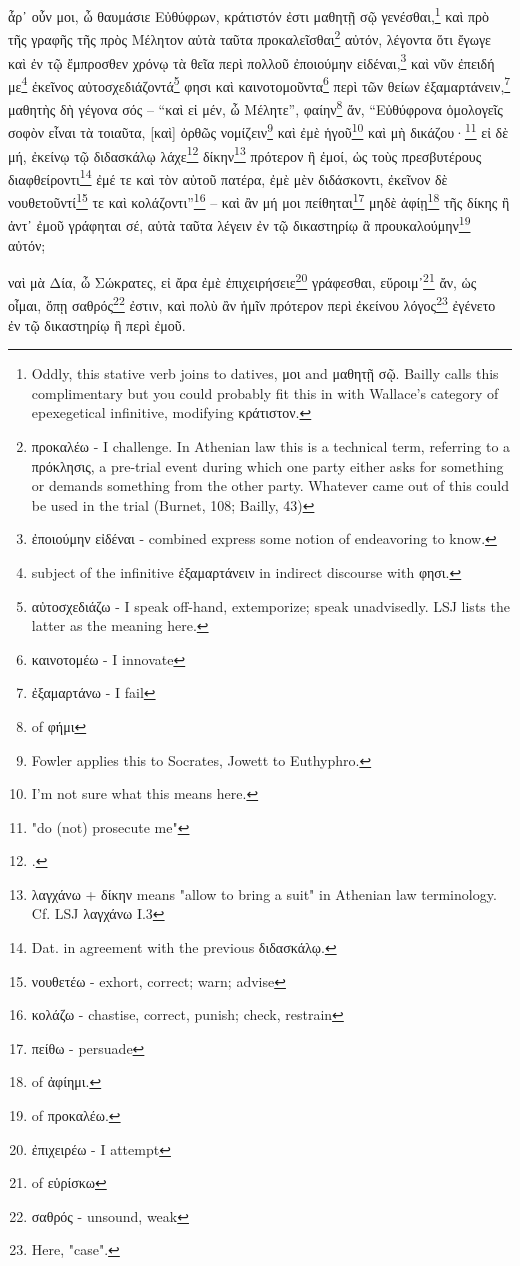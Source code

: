 ἆρ᾽
οὖν
μοι,
ὦ
θαυμάσιε
Εὐθύφρων,
κράτιστόν
ἐστι
μαθητῇ
σῷ
γενέσθαι,\footnote{Oddly, this stative verb joins to datives, μοι and μαθητῇ σῷ. Bailly calls this complimentary but you could probably fit this in with Wallace's category of epexegetical infinitive, modifying κράτιστον.}
καὶ
πρὸ
τῆς
γραφῆς
τῆς
πρὸς
Μέλητον
αὐτὰ
ταῦτα
προκαλεῖσθαι\footnote{προκαλέω - I challenge. In Athenian law this is a technical term, referring to a πρόκλησις, a pre-trial event during which one party either asks for something or demands something from the other party. Whatever came out of this could be used in the trial (Burnet, 108; Bailly, 43)}
αὐτόν,
λέγοντα
ὅτι
ἔγωγε
καὶ
ἐν
τῷ
ἔμπροσθεν
χρόνῳ
τὰ
θεῖα
περὶ
πολλοῦ
ἐποιούμην
εἰδέναι,\footnote{ἐποιούμην εἰδέναι - combined express some notion of endeavoring to know.}
καὶ
νῦν
ἐπειδή
με\footnote{subject of the infinitive ἐξαμαρτάνειν in indirect discourse with φησι.}
ἐκεῖνος
αὐτοσχεδιάζοντά\footnote{αὐτοσχεδιάζω - I speak off-hand, extemporize; speak unadvisedly. LSJ lists the latter as the meaning here.}
φησι
καὶ
καινοτομοῦντα\footnote{καινοτομέω - I innovate}
περὶ
τῶν
θείων
ἐξαμαρτάνειν,\footnote{ἐξαμαρτάνω - I fail}
μαθητὴς
δὴ
γέγονα
σός
--
“καὶ
εἰ
μέν,
ὦ
Μέλητε”,
φαίην\footnote{ of φήμι}
ἄν,
“Εὐθύφρονα
ὁμολογεῖς
\versification{[5b]}
σοφὸν
εἶναι
τὰ
τοιαῦτα,
[καὶ]
ὀρθῶς
νομίζειν\footnote{Fowler applies this to Socrates, Jowett to Euthyphro. }
καὶ
ἐμὲ
ἡγοῦ\footnote{I'm not sure what this means here.}
καὶ
μὴ
δικάζου·\footnote{"do (not) prosecute me"}
εἰ
δὲ
μή,
ἐκείνῳ
τῷ
διδασκάλῳ
λάχε\footnote{.}
δίκην\footnote{λαγχάνω + δίκην means "allow to bring a suit" in Athenian law terminology. Cf. LSJ λαγχάνω I.3}
πρότερον
ἢ
ἐμοί,
ὡς
τοὺς
πρεσβυτέρους
διαφθείροντι\footnote{Dat. in agreement with the previous διδασκάλῳ.}
ἐμέ
τε
καὶ
τὸν
αὑτοῦ
πατέρα,
ἐμὲ
μὲν
διδάσκοντι,
ἐκεῖνον
δὲ
νουθετοῦντί\footnote{νουθετέω - exhort, correct; warn; advise}
τε
καὶ
κολάζοντι”\footnote{κολάζω - chastise, correct, punish; check, restrain}
--
καὶ
ἂν
μή
μοι
πείθηται\footnote{πείθω - persuade}
μηδὲ
ἀφίῃ\footnote{ of ἀφίημι.}
τῆς
δίκης
ἢ
ἀντ᾽
ἐμοῦ
γράφηται
σέ,
αὐτὰ
ταῦτα
λέγειν
ἐν
τῷ
δικαστηρίῳ
ἃ
προυκαλούμην\footnote{ of προκαλέω.}
αὐτόν;

ναὶ
μὰ
Δία,
ὦ
Σώκρατες,
εἰ
ἄρα
ἐμὲ
ἐπιχειρήσειε\footnote{ἐπιχειρέω - I attempt}
\versification{[5c]}
γράφεσθαι,
εὕροιμ᾽\footnote{ of εὑρίσκω}
ἄν,
ὡς
οἶμαι,
ὅπῃ
σαθρός\footnote{σαθρός - unsound, weak}
ἐστιν,
καὶ
πολὺ
ἂν
ἡμῖν
πρότερον
περὶ
ἐκείνου
λόγος\footnote{Here, "case".}
ἐγένετο
ἐν
τῷ
δικαστηρίῳ
ἢ
περὶ
ἐμοῦ.

